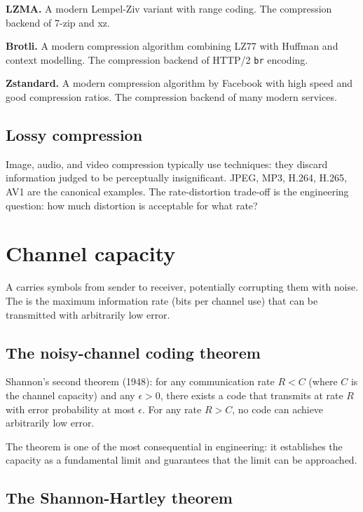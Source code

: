 \textbf{LZMA.} A modern Lempel-Ziv variant with range coding. The compression backend of 7-zip and xz.

\textbf{Brotli.} A modern compression algorithm combining LZ77 with Huffman and context modelling. The compression backend of HTTP/2 \texttt{br} encoding.

\textbf{Zstandard.} A modern compression algorithm by Facebook with high speed and good compression ratios. The compression backend of many modern services.

\subsection{Lossy compression}

Image, audio, and video compression typically use  techniques: they discard information judged to be perceptually insignificant. JPEG, MP3, H.264, H.265, AV1 are the canonical examples. The rate-distortion trade-off is the engineering question: how much distortion is acceptable for what rate?

\section{Channel capacity}

A  carries symbols from sender to receiver, potentially corrupting them with noise. The  is the maximum information rate (bits per channel use) that can be transmitted with arbitrarily low error.

\subsection{The noisy-channel coding theorem}

Shannon's second theorem (1948): for any communication rate $R < C$ (where $C$ is the channel capacity) and any $\epsilon > 0$, there exists a code that transmits at rate $R$ with error probability at most $\epsilon$. For any rate $R > C$, no code can achieve arbitrarily low error.

The theorem is one of the most consequential in engineering: it establishes the capacity as a fundamental limit and guarantees that the limit can be approached.

\subsection{The Shannon-Hartley theorem}

